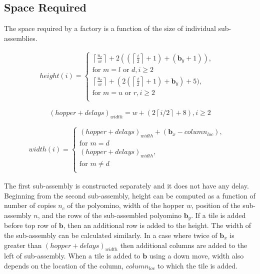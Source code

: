 \subsection{Space Required}\label{sec:requiredSpace}
The space required by a factory is a function of the size of individual sub-assemblies.

\begin{align}
height(i)=
\begin{cases}
\left \lceil{   \frac{n_c}{w}}\right \rceil+2((\left \lceil{\frac{i}{2}}\right \rceil+1)+(\mathbf{b}_y+1)),&\\ 
\text{for } m = l \text{ or } d, i \geq 2&\\
\left \lceil{   \frac{n_c}{w}}\right \rceil+(2(\left \lceil{\frac{i}{2}}\right \rceil+1)+\mathbf{b}_y)+5),&\\ 
\text{for } m = u \text{ or } r, i \geq 2&\\
\end{cases}
\end{align}



\begin{equation}
(hopper+delays)_{width}=w+(2\left \lceil{i/2}\right \rceil+8),  i \geq 2
\end{equation}

\begin{align}
width(i)=
\begin{cases}
(hopper+delays)_{width}+(\mathbf{b}_x-column_{loc}),&\\ 
\text{for } m = d &\\
(hopper+delays)_{width},&\\ 
\text{for } m \neq d &\\
\end{cases}
\end{align}

The first sub-assembly is constructed separately and it does not have any delay.
Beginning from the second sub-assembly, height can be computed as a function of number of copies $n_c$ of the polyomino, width of the hopper $w$, position of the sub-assembly $n$, and the rows of the sub-assembled polyomino $\mathbf{b}_y$. If a tile is added before top row of $\mathbf{b}$, then an additional row is added to the height.
The width of the sub-assembly can be calculated similarly. 
In a case where twice of $\mathbf{b}_x$ is greater than $(hopper+delays)_{width}$ then additional columns are added to the left of sub-assembly. 
When a tile is added to $\mathbf{b}$ using a down move, width also depends on the location of the column, $column_{loc}$ to which the tile is added.  
  

